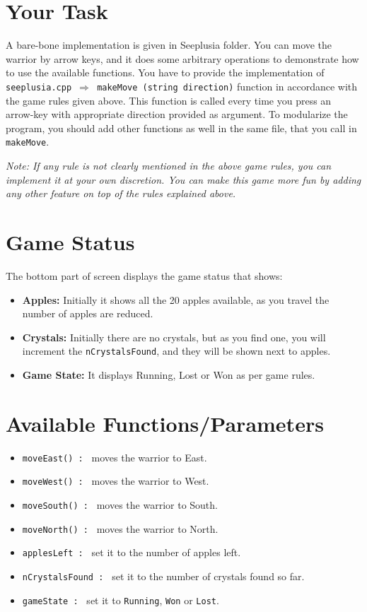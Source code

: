 \documentclass[a4paper,12pt]{article}
\begin{document}
	\section{Your Task}
	 A bare-bone implementation is given in Seeplusia folder. You can move the warrior by arrow keys, and it does some arbitrary operations to demonstrate how to use the available functions. You have to provide the implementation of \texttt{seeplusia.cpp $\Rightarrow$ makeMove (string direction)} function in accordance with the game rules given above. This function is called every time you press an arrow-key with appropriate direction provided as argument. To modularize the program, you should add other functions as well in the same file, that you call in \texttt{makeMove}.
	 
	\textit{ Note: If any rule is not clearly mentioned in the above game rules, you can implement it at your own discretion. You can make this game more fun by adding any other feature on top of the rules explained above. }
	
	\section{Game Status}
	The bottom part of screen displays the game status that shows:
	
	\begin{itemize}
		\item \textbf{Apples: } Initially it shows all the 20 apples available, as you travel the number of apples are reduced. 
		\item \textbf{Crystals: } Initially there are no crystals, but as you find one, you will increment the \texttt{nCrystalsFound}, and they will be shown next to apples.
		\item \textbf{Game State: } It displays Running, Lost or Won as per game rules. 
	\end{itemize}
	
	\section{Available Functions/Parameters}
	
	\begin{itemize}
		\item \texttt{moveEast() : } moves the warrior to East.
		\item \texttt{moveWest() : } moves the warrior to West.
		\item \texttt{moveSouth() : } moves the warrior to South.
		\item \texttt{moveNorth() : } moves the warrior to North.
		\item \texttt{applesLeft : } set it to the number of apples left.
		\item \texttt{nCrystalsFound : } set it to the number of crystals found so far.
		\item \texttt{gameState : } set it to \texttt{Running}, \texttt{Won} or \texttt{Lost}.
	\end{itemize}
\end{document}
